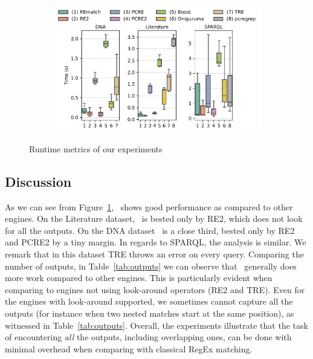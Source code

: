 \begin{figure}[t]
	\centering
	\begin{subfigure}[b]{.8\textwidth}
		\centering
		\includegraphics[width=\textwidth]{figures/lookahead-time.pdf}
	\end{subfigure}
	\caption{Runtime metrics of our experiments}
	\label{fig:comparison}
\end{figure}



\subsection{Discussion}
As we can see from Figure~\ref{fig:comparison}, \rematch\ shows good performance
as compared to other engines. On the \textsf{Literature} dataset, \rematch\ is
bested only by \textsf{RE2}, which does not look for all the outputs. On the
\textsf{DNA} dataset \rematch\ is a close third, bested only by \textsf{RE2} and
\textsf{PCRE2} by a tiny margin. In regards to \textsf{SPARQL}, the analysis is
similar. We remark that in this dataset \textsf{TRE} throws an error on every
query. Comparing the number of outputs, in Table~\ref{tab:outputs} we can
observe that \rematch\ generally does more work compared to other engines. This
is particularly evident when comparing to engines not using look-around
operators (\textsf{RE2} and \textsf{TRE}). Even for the engines with look-around
supported, we sometimes cannot capture all the outputs (for instance when two
nested matches start at the same position), as witnessed in
Table~\ref{tab:outputs}. Overall, the experiments illustrate that the task of
encountering \emph{all} the outputs, including overlapping ones, can be done
with minimal overhead when comparing with classical RegEx matching.
